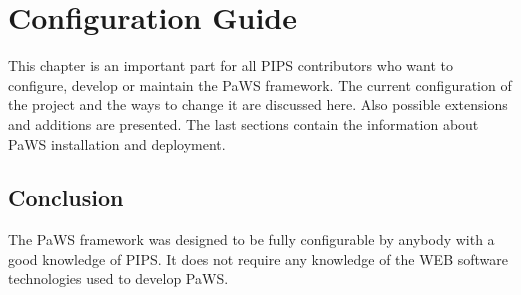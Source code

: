 \chapter{Configuration Guide}
\label{configuration_guide}

This chapter is an important part for all PIPS contributors who want
to configure, develop or maintain the PaWS framework. The current
configuration of the project and the ways to change it are discussed
here. Also possible extensions and additions are presented. The last
sections contain the information about PaWS installation and
deployment.









\section{Conclusion}

The PaWS framework was designed to be fully configurable by anybody
with a good knowledge of PIPS. It does not require any knowledge of
the WEB software technologies used to develop PaWS.

